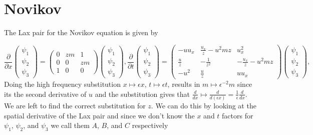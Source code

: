 \documentclass[english,master]{liumaiex}
\theoremstyle{plain}
\theoremstyle{definition}
\begin{document}
\section{Novikov}

The Lax pair for the Novikov equation\cite{Lundmark_2022} is given by

\begin{subequations}
  \label{eq:Novikov-lax}
  \begin{equation}
    \label{eq:Novikov-lax-x}
    \frac{\partial}{\partial x}
    \begin{pmatrix} \psi_1 \\ \psi_2 \\ \psi_3 \end{pmatrix} =
    \begin{pmatrix}
      0 & zm & 1 \\
      0 & 0 & zm \\
      1 & 0 & 0
    \end{pmatrix}
    \begin{pmatrix} \psi_1 \\ \psi_2 \\ \psi_3 \end{pmatrix}
    ,
  \end{equation}
  \begin{equation}
    \label{eq:Novikov-lax-t}
    \frac{\partial}{\partial t}
    \begin{pmatrix} \psi_1 \\ \psi_2 \\ \psi_3 \end{pmatrix} =
    \begin{pmatrix}
      -u u_x & \frac{u_x}{z}-u^2 mz & u_x^2 \\
      \frac{u}{z} & - \frac{1}{z^2} & - \frac{u_x}{z} - u^2 mz \\
      -u^2 & \frac{u}{z} & uu_x
    \end{pmatrix}
    \begin{pmatrix} \psi_1 \\ \psi_2 \\ \psi_3 \end{pmatrix}
    ,
  \end{equation}
\end{subequations}
%
Doing the high frequency substitution $x \mapsto \epsilon x$, $t \mapsto \epsilon t$, results in $m \mapsto \epsilon^{-2} m$ since its the second derivative of $u$ and the substitution gives that $\frac{d}{dx} \mapsto \frac{d}{d (\epsilon x)} = \frac{1}{\epsilon} \frac{d}{dx}$. We are left to find the correct substitution for $z$. We can do this by looking at the spatial derivative of the Lax pair and since we don't know the $x$ and $t$ factors for $\psi_1$, $\psi_2$, and $\psi_3$ we call them $A$, $B$, and $C$ respectively
\end{document}
